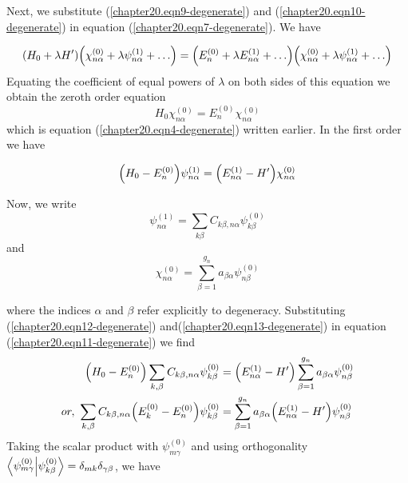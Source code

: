 	Next, we substitute (\ref{chapter20.eqn9-degenerate}) and (\ref{chapter20.eqn10-degenerate}) in equation (\ref{chapter20.eqn7-degenerate}). We have

	\begin{equation}
		\qty(H_0 + \lambda H^\prime) \qty(\chi_{n\alpha}^{(0)} + \lambda \psi_{n \alpha}^{(1)} + \ldots) 
		= \qty(E_n^{(0)} + \lambda E_{n\alpha}^{(1)} + \ldots) \qty(\chi_{n\alpha}^{(0)} + \lambda \psi_{n \alpha}^{(1)} + \ldots) 
	\end{equation}
	Equating the coefficient of equal powers of $\lambda$ on both sides of this equation we obtain the zeroth order equation
	\begin{equation}
		H_0 \chi_{n\alpha}^{(0)} = E_n^{(0)} \chi_{n\alpha}^{(0)}
	\end{equation}
	which is equation (\ref{chapter20.eqn4-degenerate}) written earlier. In the first order we have
	
	
	
	\begin{equation}
		\qty(H_0 - E_n^{(0)}) \psi_{n \alpha}^{(1)} = \qty(E_{n\alpha}^{(1)} - H^\prime) \chi_{n\alpha}^{(0)}
		\label{chapter20.eqn11-degenerate}
	\end{equation}
	
	Now, we write
	\begin{equation}
		\psi_{n \alpha}^{(1)} = \sum_{k\beta} C_{k\beta, n\alpha} \psi_{k \beta}^{(0)}
		\label{chapter20.eqn12-degenerate}
	\end{equation}
	and
	\begin{equation}
		\chi_{n\alpha}^{(0)} = \sum_{\beta=1}^{g_n} a_{\beta\alpha} \psi_{n\beta}^{(0)}
		\label{chapter20.eqn13-degenerate}
	\end{equation}
	
	where the indices $\alpha$ and $\beta$ refer explicitly to degeneracy. Substituting (\ref{chapter20.eqn12-degenerate}) and(\ref{chapter20.eqn13-degenerate}) in equation (\ref{chapter20.eqn11-degenerate}) we find
	\begin{align}
		\qty(H_0 - E_n^{(0)}) \sum_{k,\beta} C_{k\beta, n\alpha} \psi_{k \beta}^{(0)} 
		&= \qty(E_{n\alpha}^{(1)} - H^\prime) \sum_{\beta=1}^{g_n} a_{\beta\alpha} \psi_{n\beta}^{(0)} \\
		or,\ \sum_{k,\beta} C_{k\beta, n\alpha} \qty(E_k^{(0)} - E_n^{(0)}) \psi_{k \beta}^{(0)} 
		&= \sum_{\beta=1}^{g_n} a_{\beta\alpha} \qty(E_{n\alpha}^{(1)} - H^\prime) \psi_{n\beta}^{(0)} 
	\end{align}
	Taking the scalar product with $\psi_{m\gamma}^{(0)}$ and using orthogonality $\braket{\psi_{m\gamma}^{(0)}}{\psi_{k\beta}^{(0)}} = \delta_{m k} \delta_{\gamma \beta}$, we have
	
